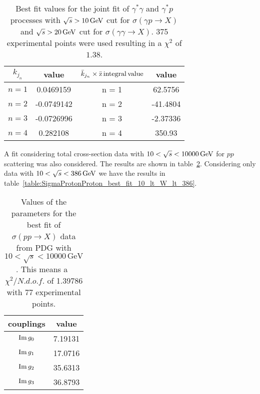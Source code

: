 \documentclass[preprint, 12pt]{elsarticle}
\begin{document}
\begin{table}[b!]
\centering
\caption{Best fit values for the joint fit of $\gamma^*\gamma$ and $\gamma^*p$ processes with $\sqrt{s} > 10 \, {\rm GeV }$ cut for $\sigma\left(\gamma p \rightarrow X\right)$ and $\sqrt{s} > 20 \, {\rm GeV }$ cut for $\sigma\left(\gamma \gamma \rightarrow X\right)$. 375 experimental points were used resulting in a $\chi^2$ of $1.38$.}
\begin{tabular}{|c|c|c|c|}
\hline
$k_{j_n}$ & value & $\bar{k}_{j_n} \times \rm{\bar{z} \, integral \, value}$ & value \\
\hline
$n = 1$ & 0.0469159 & n = 1 & 62.5756 \\
\hline
$n = 2$ & -0.0749142 & n = 2 & -41.4804 \\
\hline
$n = 3$ & -0.0726996 & n = 3 & -2.37336\\
\hline
$n = 4$ & 0.282108 & n = 4 & 350.93 \\
\hline
\end{tabular}
\label{table:GammaGamma_GammaProton_best_joint_fit_W_gt_20}
\end{table}
A fit considering total cross-section data with $10 < \sqrt{s} < 10000 \, \rm{GeV}$ for $pp$ scattering was also considered. The results are shown in table~\ref{table:SigmaProtonProton_best_fit_10_lt_W_lt_10000}. Considering only data with $10 < \sqrt{s} < 386 \, \rm{GeV}$ we have the results in table~\ref{table:SigmaProtonProton_best_fit_10_lt_W_lt_386}.
\begin{table}[b!]
\centering
\caption{Values of the parameters for the best fit of  $\sigma\left(p p \rightarrow X\right)$ data from PDG with $10 < \sqrt{s} < 10000 \, \text{GeV}$. This means a~$\chi^2 / {N.d.o.f.}$ of 1.39786 with 77 experimental points.}
\vspace{0.5cm}
\begin{tabular}{|c|c|}
\hline
couplings   & value \\
\hline
${\rm Im} \, g_0$  & 7.19131 \\ 
\hline
${\rm Im} \, g_1$  & 17.0716 \\ 
\hline
${\rm Im} \, g_2$  & 35.6313 \\
\hline
${\rm Im} \, g_3$  & 36.8793 \\ 
\hline
\end{tabular}
\label{table:SigmaProtonProton_best_fit_10_lt_W_lt_10000}
\end{table}
\end{document}
